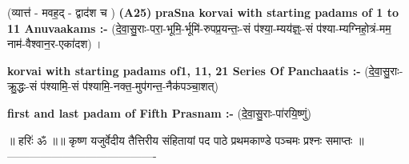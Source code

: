 \documentclass[17pt]{extarticle}
\begin{document}
                  \newline
                      (व्यात्त॑ - मवह॒द् - द्वाद॑श च )  \textbf{(A25)} \newline \newline
                \textbf{praSna korvai with starting padams of 1 to 11 Anuvaakams :-} \newline
        (दे॒वा॒सु॒राः-परा॒-भूमि॒-र्भूमि॑-रुपप्र॒यन्तः॒-सं प॑श्या॒-म्यय॑ज्ञ्ः॒-सं प॑श्या-म्यग्निहो॒त्रं-मम॒ नाम॑-वैश्वान॒र-एका॑दश) । \newline

        \textbf{korvai with starting padams of1, 11, 21 Series Of Panchaatis :-} \newline
        (दे॒वा॒सु॒राः-क्रु॒द्धः-सं प॑श्यामि॒-सं प॑श्यामि॒-नक्त॒-मुप॑गन्त॒-नैक॑पञ्चा॒शत्) \newline

        \textbf{first and last padam of Fifth Prasnam :-} \newline
        (दे॒वा॒सु॒राः-पा॑रयि॒ष्णुं) \newline 

        
        ॥ हरिः॑ ॐ ॥॥ कृष्ण यजुर्वेदीय तैत्तिरीय संहितायां पद पाठे प्रथमकाण्डे पञ्चमः प्रश्नः समाप्तः ॥
---------------------------------------- \newline
        \pagebreak
                \pagebreak
        
\end{document}
